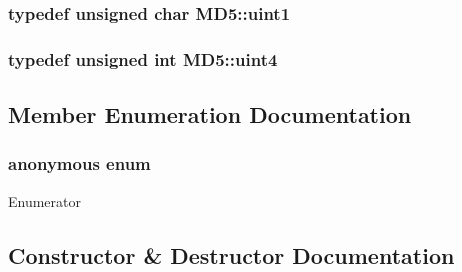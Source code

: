 \subsubsection[{\texorpdfstring{uint1}{uint1}}]{\setlength{\rightskip}{0pt plus 5cm}typedef unsigned char {\bf M\+D5\+::uint1}\hspace{0.3cm}{\ttfamily [private]}}\hypertarget{class_m_d5_a3b1c4901139aef256ee49c4ab14d09f9}{}\label{class_m_d5_a3b1c4901139aef256ee49c4ab14d09f9}
\subsubsection[{\texorpdfstring{uint4}{uint4}}]{\setlength{\rightskip}{0pt plus 5cm}typedef unsigned int {\bf M\+D5\+::uint4}\hspace{0.3cm}{\ttfamily [private]}}\hypertarget{class_m_d5_a2e5b84a3d7db292f49873061214a0444}{}\label{class_m_d5_a2e5b84a3d7db292f49873061214a0444}


\subsection{Member Enumeration Documentation}
\subsubsection[{\texorpdfstring{anonymous enum}{anonymous enum}}]{\setlength{\rightskip}{0pt plus 5cm}anonymous enum\hspace{0.3cm}{\ttfamily [private]}}\hypertarget{class_m_d5_a6126af25978be88567667fa91a6b04a9}{}\label{class_m_d5_a6126af25978be88567667fa91a6b04a9}
\begin{Desc}
\item[Enumerator]\par
\begin{description}
\item[{\em 
blocksize\hypertarget{class_m_d5_a6126af25978be88567667fa91a6b04a9a1cc0a742ca803f75a021aef77b522963}{}\label{class_m_d5_a6126af25978be88567667fa91a6b04a9a1cc0a742ca803f75a021aef77b522963}
}]\end{description}
\end{Desc}


\subsection{Constructor \& Destructor Documentation}
